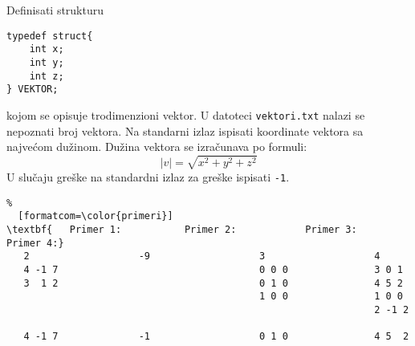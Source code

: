 \documentclass{article}
\begin{document}
\begin{z}
Definisati strukturu 
\begin{verbatim}
typedef struct{
    int x;
    int y;
    int z;
} VEKTOR;
\end{verbatim}
kojom se opisuje trodimenzioni vektor. U datoteci \verb|vektori.txt|
nalazi se nepoznati broj vektora. Na standarni
izlaz ispisati koordinate vektora sa najve\' com du\v zinom. Du\v zina vektora se izra\v cunava
po formuli:
$$|v|= \sqrt{x^2+y^2+z^2}$$ U slučaju greške na standardni izlaz za greške ispisati {\tt -1}. 
\begin{Verbatim}%
  [formatcom=\color{primeri}]
\textbf{   Primer 1:           Primer 2:            Primer 3:           Primer 4:}
   2                   -9                   3                   4
   4 -1 7                                   0 0 0               3 0 1
   3  1 2                                   0 1 0               4 5 2
                                            1 0 0               1 0 0
                                                                2 -1 2
								
   4 -1 7              -1                   0 1 0               4 5  2

\end{Verbatim}
\end{z}
\end{document}
